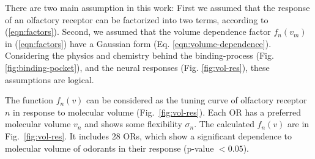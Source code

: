 \documentclass[11pt]{paper} %
\newcommand{\numberofreceptors}{ 28 }
\begin{document}
There are two main assumption in this work: 
First we assumed that the response of an olfactory receptor can be factorized into two terms, 
according to (\ref{eqn:factors}).
Second, we assumed that the volume dependence factor $f_n(v_m)$ in (\ref{eqn:factors}) 
have a Gaussian form (Eq. \ref{eqn:volume-dependence}).
Considering the physics and chemistry behind the binding-process (Fig. \ref{fig:binding-pocket}), 
and the neural responses (Fig. \ref{fig:vol-res}), 
these assumptions are logical. 


The function $f_n(v)$ can be considered as the tuning curve of olfactory receptor $n$ in response to molecular volume (Fig.~\ref{fig:vol-res}). 
Each OR has a preferred molecular volume $v_n$ and shows some flexibility $\sigma_n$. 
The calculated $f_n(v)$ are in  Fig.~\ref{fig:vol-res}. 
It includes \numberofreceptors ORs, 
which show a significant dependence to molecular volume of odorants in their response (p-value $<0.05$).
\end{document}
